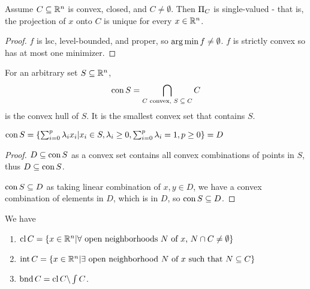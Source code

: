 \begin{thm}
  \label{sec:convexity-13}
  Assume $C \subseteq \mathbb{R}^{n}$ is convex, closed, and $C \neq
  \emptyset$.  Then $\operatorname*{\Pi}_{C}$ is single-valued - that is, the
  projection of $x$ onto $C$ is unique for every $x \in \mathbb{R}^{n}$.
\end{thm}

\begin{proof}
  $f$ is lsc, level-bounded, and proper, so $\operatorname*{arg\,min} f \neq
  \emptyset$.  $f$ is strictly convex so has at most one minimizer.
\end{proof}

\begin{defn}
  \label{sec:convexity-14}
  For an arbitrary set $S \subseteq \mathbb{R}^{n}$,
  \begin{equation}
    \label{eq:10}
    \operatorname*{con} S = \bigcap_{\text{$C$ convex, $S \subseteq C$}} C
  \end{equation}
  is the convex hull of $S$.  It is the smallest convex set that
  contains $S$.
\end{defn}

\begin{thm}
  \label{sec:convexity-15}
  $\operatorname*{con} S = \{ \sum_{i=0}^{p} \lambda_{i} x_{i} | x_{i} \in S,
  \lambda_{i} \geq 0, \sum_{i=0}^{p} \lambda_{i} = 1, p \geq 0  \} = D$
\end{thm}

\begin{proof}
  $D \subseteq \operatorname*{con} S$ as a convex set contains all convex
  combinations of points in $S$, thus $D \subseteq \operatorname*{con} S$.

  $\operatorname*{con} S \subseteq D$ as taking linear combination of $x, y \in D$,
  we have a convex combination of elements in $D$, which is in $D$, so
  $\operatorname*{con} S \subseteq D$.

\end{proof}

\begin{thm} We have
  \label{sec:convexity-16}
  \begin{enumerate}
  \item
    $\operatorname*{cl} C = \{ x \in \mathbb{R}^{n} | \text{$\forall$ open neighborhoods
      $N$ of $x$, $N \cap C \neq \emptyset$} \}$
  \item $\operatorname*{int} C = \{ x \in \mathbb{R}^{n} | \text{$\exists$ open
      neighborhood $N$ of $x$ such that $N \subseteq C$} \} $
  \item $\operatorname*{bnd} C = \operatorname*{cl} C \backslash \int C$.
  \end{enumerate}
\end{thm}

